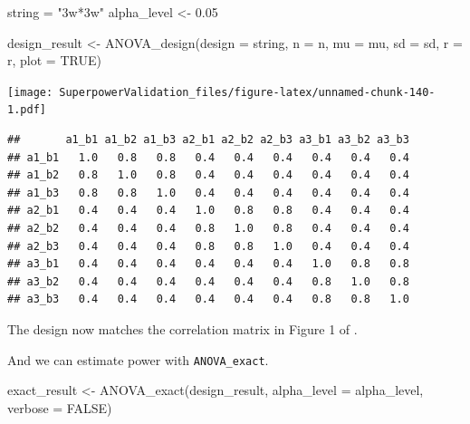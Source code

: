 \documentclass[
]{book}
\newenvironment{Shaded}{\begin{snugshade}}{\end{snugshade}}
\newcommand{\AttributeTok}[1]{\textcolor[rgb]{0.77,0.63,0.00}{#1}}
\newcommand{\ConstantTok}[1]{\textcolor[rgb]{0.00,0.00,0.00}{#1}}
\newcommand{\FloatTok}[1]{\textcolor[rgb]{0.00,0.00,0.81}{#1}}
\newcommand{\FunctionTok}[1]{\textcolor[rgb]{0.00,0.00,0.00}{#1}}
\newcommand{\NormalTok}[1]{#1}
\newcommand{\OtherTok}[1]{\textcolor[rgb]{0.56,0.35,0.01}{#1}}
\newcommand{\SpecialCharTok}[1]{\textcolor[rgb]{0.00,0.00,0.00}{#1}}
\newcommand{\StringTok}[1]{\textcolor[rgb]{0.31,0.60,0.02}{#1}}
\begin{document}
\begin{Shaded}
\begin{Highlighting}[]
\NormalTok{string }\OtherTok{=} \StringTok{"3w*3w"}
\NormalTok{alpha\_level }\OtherTok{\textless{}{-}} \FloatTok{0.05}

\NormalTok{design\_result }\OtherTok{\textless{}{-}} \FunctionTok{ANOVA\_design}\NormalTok{(}\AttributeTok{design =}\NormalTok{ string,}
                              \AttributeTok{n =}\NormalTok{ n, }
                              \AttributeTok{mu =}\NormalTok{ mu, }
                              \AttributeTok{sd =}\NormalTok{ sd, }
                              \AttributeTok{r =}\NormalTok{ r, }
                              \AttributeTok{plot =} \ConstantTok{TRUE}\NormalTok{)}
\end{Highlighting}
\end{Shaded}

\texttt{[image: SuperpowerValidation\_files/figure-latex/unnamed-chunk-140-1.pdf]}

\begin{Shaded}
\end{Shaded}

\begin{verbatim}
##       a1_b1 a1_b2 a1_b3 a2_b1 a2_b2 a2_b3 a3_b1 a3_b2 a3_b3
## a1_b1   1.0   0.8   0.8   0.4   0.4   0.4   0.4   0.4   0.4
## a1_b2   0.8   1.0   0.8   0.4   0.4   0.4   0.4   0.4   0.4
## a1_b3   0.8   0.8   1.0   0.4   0.4   0.4   0.4   0.4   0.4
## a2_b1   0.4   0.4   0.4   1.0   0.8   0.8   0.4   0.4   0.4
## a2_b2   0.4   0.4   0.4   0.8   1.0   0.8   0.4   0.4   0.4
## a2_b3   0.4   0.4   0.4   0.8   0.8   1.0   0.4   0.4   0.4
## a3_b1   0.4   0.4   0.4   0.4   0.4   0.4   1.0   0.8   0.8
## a3_b2   0.4   0.4   0.4   0.4   0.4   0.4   0.8   1.0   0.8
## a3_b3   0.4   0.4   0.4   0.4   0.4   0.4   0.8   0.8   1.0
\end{verbatim}

The design now matches the correlation matrix in Figure 1 of \citet{potvin2000statistical}.

And we can estimate power with \texttt{ANOVA\_exact}.

\begin{Shaded}
\begin{Highlighting}[]
\NormalTok{exact\_result }\OtherTok{\textless{}{-}} \FunctionTok{ANOVA\_exact}\NormalTok{(design\_result,}
                            \AttributeTok{alpha\_level =}\NormalTok{ alpha\_level,}
                            \AttributeTok{verbose =} \ConstantTok{FALSE}\NormalTok{)}
\end{Highlighting}
\end{Shaded}
\end{document}
